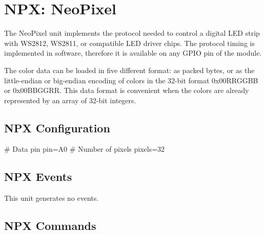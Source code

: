 \section{NPX: NeoPixel}

The NeoPixel unit implements the protocol needed to control a digital LED strip with WS2812, WS2811, or compatible LED driver chips. The protocol timing is implemented in software, therefore it is available on any GPIO pin of the module.

The color data can be loaded in five different format: as packed bytes, or as the little-endian or big-endian encoding of colors in the 32-bit format 0x00RRGGBB or 0x00BBGGRR. This data format is convenient when the colors are already represented by an array of 32-bit integers.

\subsection{NPX Configuration}

\begin{inicode}
# Data pin
pin=A0
# Number of pixels
pixels=32
\end{inicode}

\subsection{NPX Events}

This unit generates no events.

\subsection{NPX Commands}

